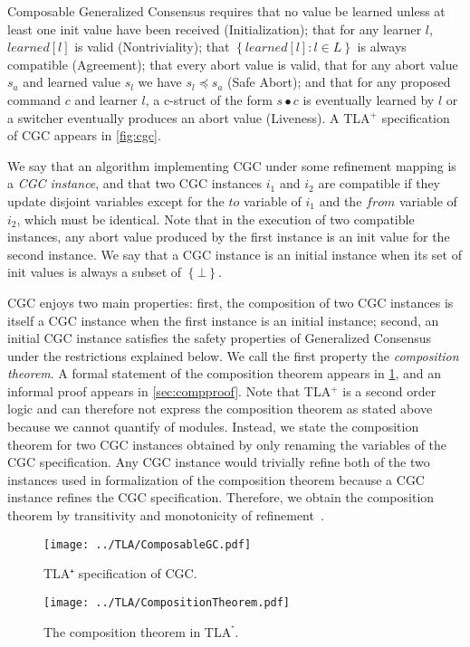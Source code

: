 Composable Generalized Consensus requires that no value be learned unless at least one init value have been received (Initialization); that for any learner $l$, $learned\left[ l \right]$ is valid (Nontriviality); that $\left\{ learned\left[ l \right] :  l \in L\right\}$ is always compatible (Agreement); that every abort value is valid, that for any abort value $s_a$ and learned value $s_l$ we have $s_l \preceq s_a$ (Safe Abort); and that for any proposed command $c$ and learner $l$, a c-struct
of the form $s\bullet c$ is eventually learned by $l$ or a switcher eventually produces an abort value (Liveness).
A TLA$^+$ specification of CGC appears in \cref{fig:cgc}.

We say that an algorithm implementing CGC under some refinement mapping is a \emph{CGC instance}, and that two CGC instances $i_1$ and $i_2$ are compatible if they update disjoint variables except for the $to$ variable of $i_1$ and the $from$ variable of $i_2$, which must be identical.
Note that in the execution of two compatible instances, any abort value produced by the first instance is an init value for the second instance.
We say that a CGC instance is an initial instance when its set of init values is always a subset of $\left\{ \bot \right\}$.   

CGC enjoys two main properties: first, the composition of two CGC instances is itself a CGC instance when the first instance is an initial instance; second, an initial CGC instance satisfies the safety properties of Generalized Consensus under the restrictions explained below.
We call the first property the \emph{composition theorem}.
A formal statement of the composition theorem appears in \cref{fig:compthm}, and an informal proof appears in \cref{sec:compproof}. 
Note that TLA$^+$ is a second order logic and can therefore not express the composition theorem as stated above because we cannot quantify of modules.
Instead, we state the composition theorem for two CGC instances obtained by only renaming the variables of the CGC specification.
Any CGC instance would trivially refine both of the two instances used in formalization of the composition theorem because a CGC instance refines the CGC specification.
Therefore, we obtain the composition theorem by transitivity and monotonicity of refinement~\cite{AbadiLamport91ExistenceRefinementMappings}.

\begin{figure}
\begin{minipage}[t]{.49\textwidth}
    \centering
    \texttt{[image: ../TLA/ComposableGC.pdf]}
    \caption{TLA$⁺$ specification of CGC.}\label{fig:cgc}%
\end{minipage}\hfill
\begin{minipage}[t]{.49\textwidth}
    \centering
    \texttt{[image: ../TLA/CompositionTheorem.pdf]}
    \caption{The composition theorem in TLA$^⁺$.}\label{fig:compthm}%
\end{minipage}
\end{figure}

